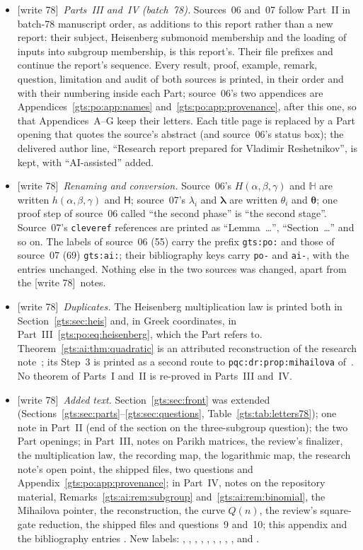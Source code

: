 \documentclass[11pt,letterpaper]{article}
\theoremstyle{definition}
\theoremstyle{remark}
\newcommand{\HH}{\mathsf H}
\newcommand{\vv}{\boldsymbol\theta}
\newcommand{\wtagb}{\textup{[write 78]}}
\begin{document}
\begin{itemize}
\item \wtagb\ \emph{Parts~III and~IV (batch~78).} Sources~06 and~07 follow Part~II in batch-78 manuscript order, as additions to this report rather than a new report: their subject, Heisenberg submonoid membership and the loading of inputs into subgroup membership, is this report's. Their file prefixes  and  continue the report's sequence. Every result, proof, example, remark, question, limitation and audit of both sources is printed, in their order and with their numbering inside each Part; source~06's two appendices are Appendices~\ref{gts:po:app:names} and~\ref{gts:po:app:provenance}, after this one, so that Appendices~A--G keep their letters. Each title page is replaced by a Part opening that quotes the source's abstract (and source~06's status box); the delivered author line, ``Research report prepared for Vladimir Reshetnikov'', is kept, with ``AI-assisted'' added.
\item \wtagb\ \emph{Renaming and conversion.} Source~06's $H(\alpha,\beta,\gamma)$ and $\mathbb H$ are written $h(\alpha,\beta,\gamma)$ and $\HH$; source~07's $\lambda_i$ and $\boldsymbol\lambda$ are written $\theta_i$ and $\vv$; one proof step of source~06 called ``the second phase'' is ``the second stage''. Source~07's \texttt{cleveref} references are printed as ``Lemma~\ldots'', ``Section~\ldots'' and so on. The labels of source~06 (55) carry the prefix \texttt{gts:po:} and those of source~07 (69) \texttt{gts:ai:}; their bibliography keys carry \texttt{po-} and \texttt{ai-}, with the entries unchanged. Nothing else in the two sources was changed, apart from the \wtagb\ notes.
\item \wtagb\ \emph{Duplicates.} The Heisenberg multiplication law is printed both in Section~\ref{gts:sec:heis} and, in Greek coordinates, in Part~III~\eqref{gts:po:eq:heisenberg}, which the Part refers to. Theorem~\ref{gts:ai:thm:quadratic} is an attributed reconstruction of the research note~\cite{repo-comm}; its Step~3 is printed as a second route to \texttt{pqc:dr:prop:mihailova} of~\cite{pqc}. No theorem of Parts~I and~II is re-proved in Parts~III and~IV.
\item \wtagb\ \emph{Added text.} Section~\ref{gts:sec:front} was extended (Sections~\ref{gts:sec:parts}--\ref{gts:sec:questions}, Table~\ref{gts:tab:letters78}); one note in Part~II (end of the section on the three-subgroup question); the two Part openings; in Part~III, notes on Parikh matrices, the review's finalizer, the multiplication law, the recording map, the logarithmic map, the research note's open point, the shipped files, two questions and Appendix~\ref{gts:po:app:provenance}; in Part~IV, notes on the repository material, Remarks~\ref{gts:ai:rem:subgroup} and~\ref{gts:ai:rem:binomial}, the Mihailova pointer, the reconstruction, the curve $Q(n)$, the review's square-gate reduction, the shipped files and questions~9 and~10; this appendix and the bibliography entries \cite{mssy,repo-cmc,repo-rev808,repo-revaffine}. New labels: , , , , , , , , ,  and .

\end{itemize}
\end{document}
